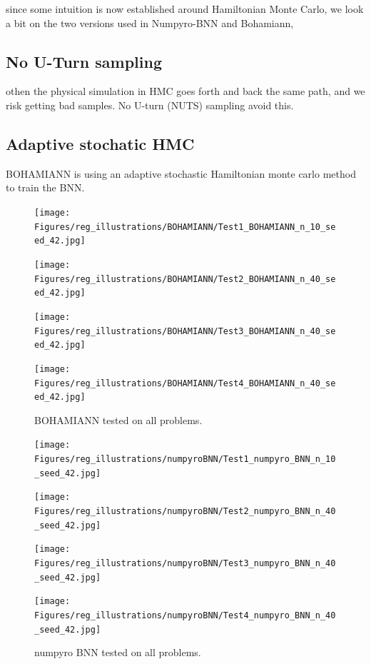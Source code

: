 since some intuition is now established around Hamiltonian Monte Carlo, 
we look a bit on the two versions used in Numpyro-BNN and Bohamiann, 

\subsection{No U-Turn sampling}

othen the physical simulation in HMC goes forth and back the same path, and we risk getting bad samples.
No U-turn (NUTS) sampling avoid this. 

\subsection{Adaptive stochatic HMC}
BOHAMIANN is using an adaptive stochastic Hamiltonian monte carlo method to train the BNN. 


\begin{figure}[h]
    \centering
    \begin{minipage}[b]{0.49\textwidth}
     \texttt{[image: Figures/reg\_illustrations/BOHAMIANN/Test1\_BOHAMIANN\_n\_10\_seed\_42.jpg]}
    \end{minipage}
    \hfill
    \begin{minipage}[b]{0.49\textwidth}
      \texttt{[image: Figures/reg\_illustrations/BOHAMIANN/Test2\_BOHAMIANN\_n\_40\_seed\_42.jpg]}
     \end{minipage}
    
     \begin{minipage}[b]{0.49\textwidth}
      \texttt{[image: Figures/reg\_illustrations/BOHAMIANN/Test3\_BOHAMIANN\_n\_40\_seed\_42.jpg]}
     \end{minipage}
     \hfill
     \begin{minipage}[b]{0.49\textwidth}
       \texttt{[image: Figures/reg\_illustrations/BOHAMIANN/Test4\_BOHAMIANN\_n\_40\_seed\_42.jpg]}
      \end{minipage}
      \caption{BOHAMIANN tested on all problems.}
\end{figure}


\begin{figure}[h]
    \centering
    \begin{minipage}[b]{0.49\textwidth}
     \texttt{[image: Figures/reg\_illustrations/numpyroBNN/Test1\_numpyro\_BNN\_n\_10\_seed\_42.jpg]}
    \end{minipage}
    \hfill
    \begin{minipage}[b]{0.49\textwidth}
      \texttt{[image: Figures/reg\_illustrations/numpyroBNN/Test2\_numpyro\_BNN\_n\_40\_seed\_42.jpg]}
     \end{minipage}
    
     \begin{minipage}[b]{0.49\textwidth}
      \texttt{[image: Figures/reg\_illustrations/numpyroBNN/Test3\_numpyro\_BNN\_n\_40\_seed\_42.jpg]}
     \end{minipage}
     \hfill
     \begin{minipage}[b]{0.49\textwidth}
       \texttt{[image: Figures/reg\_illustrations/numpyroBNN/Test4\_numpyro\_BNN\_n\_40\_seed\_42.jpg]}
      \end{minipage}
      \caption{numpyro BNN tested on all problems.}
\end{figure}
